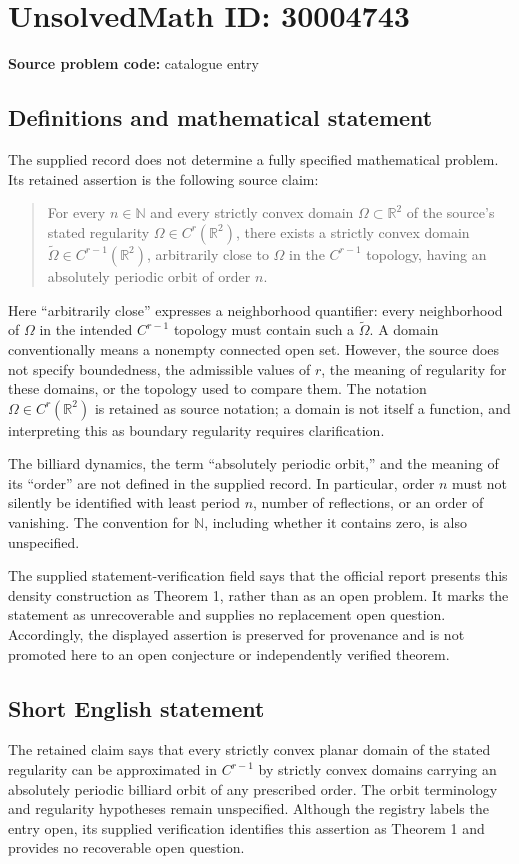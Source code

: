 \documentclass[11pt]{article}
\newcommand{\N}{\mathbb{N}}
\newcommand{\R}{\mathbb{R}}
\begin{document}
\section*{UnsolvedMath ID: 30004743}
\textbf{Source problem code:} catalogue entry
\subsection{Definitions and mathematical statement}
The supplied record does not determine a fully specified mathematical problem. Its retained assertion is the following source claim:
\begin{quote}
For every \(n\in\N\) and every strictly convex domain \(\Omega\subset\R^2\) of the source's stated regularity \(\Omega\in C^r(\R^2)\), there exists a strictly convex domain \(\widetilde\Omega\in C^{r-1}(\R^2)\), arbitrarily close to \(\Omega\) in the \(C^{r-1}\) topology, having an absolutely periodic orbit of order \(n\).
\end{quote}
Here ``arbitrarily close'' expresses a neighborhood quantifier: every neighborhood of \(\Omega\) in the intended \(C^{r-1}\) topology must contain such a \(\widetilde\Omega\). A domain conventionally means a nonempty connected open set. However, the source does not specify boundedness, the admissible values of \(r\), the meaning of regularity for these domains, or the topology used to compare them. The notation \(\Omega\in C^r(\R^2)\) is retained as source notation; a domain is not itself a function, and interpreting this as boundary regularity requires clarification.

The billiard dynamics, the term ``absolutely periodic orbit,'' and the meaning of its ``order'' are not defined in the supplied record. In particular, order \(n\) must not silently be identified with least period \(n\), number of reflections, or an order of vanishing. The convention for \(\N\), including whether it contains zero, is also unspecified.

The supplied statement-verification field says that the official report presents this density construction as Theorem 1, rather than as an open problem. It marks the statement as unrecoverable and supplies no replacement open question. Accordingly, the displayed assertion is preserved for provenance and is not promoted here to an open conjecture or independently verified theorem.
\subsection{Short English statement}
The retained claim says that every strictly convex planar domain of the stated regularity can be approximated in \(C^{r-1}\) by strictly convex domains carrying an absolutely periodic billiard orbit of any prescribed order. The orbit terminology and regularity hypotheses remain unspecified. Although the registry labels the entry open, its supplied verification identifies this assertion as Theorem 1 and provides no recoverable open question.
\end{document}
